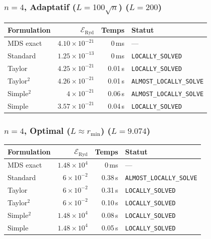 \subsubsection{$n=4$, Adaptatif ($L{=}100\sqrt{n}$) ($L=200$)}
\begin{longtable}{@{}lrrl@{}}
  \toprule
  Formulation & $\mathcal{E}_{\mathrm{Ryd}}$ & Temps & Statut \\
  \midrule
  \endhead
  MDS exact & $4.10\times10^{-21}$ & 0\,ms & --- \\
  Standard & $1.25\times10^{-13}$ & 0\,ms & \texttt{LOCALLY\_SOLVED} \\
  Taylor & $4.25\times10^{-21}$ & 0.01\,s & \texttt{LOCALLY\_SOLVED} \\
  Taylor$^2$ & $4.26\times10^{-21}$ & 0.01\,s & \texttt{ALMOST\_LOCALLY\_SOLVE} \\
  Simple$^2$ & $4\times10^{-21}$ & 0.06\,s & \texttt{ALMOST\_LOCALLY\_SOLVE} \\
  Simple & $3.57\times10^{-21}$ & 0.04\,s & \texttt{LOCALLY\_SOLVED} \\
  \bottomrule
\end{longtable}

\subsubsection{$n=4$, Optimal ($L{\approx}r_{\min}$) ($L=9.074$)}
\begin{longtable}{@{}lrrl@{}}
  \toprule
  Formulation & $\mathcal{E}_{\mathrm{Ryd}}$ & Temps & Statut \\
  \midrule
  \endhead
  MDS exact & $1.48\times10^{4}$ & 0\,ms & --- \\
  Standard & $6\times10^{-2}$ & 0.38\,s & \texttt{ALMOST\_LOCALLY\_SOLVE} \\
  Taylor & $6\times10^{-2}$ & 0.31\,s & \texttt{LOCALLY\_SOLVED} \\
  Taylor$^2$ & $6\times10^{-2}$ & 0.10\,s & \texttt{LOCALLY\_SOLVED} \\
  Simple$^2$ & $1.48\times10^{4}$ & 0.08\,s & \texttt{LOCALLY\_SOLVED} \\
  Simple & $1.48\times10^{4}$ & 0.05\,s & \texttt{LOCALLY\_SOLVED} \\
  \bottomrule
\end{longtable}

